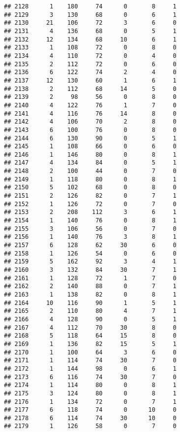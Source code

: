 \documentclass[
]{article}
\begin{document}
\begin{verbatim}
## 2128      1    180     74      0       8     1
## 2129      3    130     68      0       6     1
## 2130     21    106     72      3       6     0
## 2131      4    136     68      0       5     1
## 2132     12    134     68     10       6     1
## 2133      1    108     72      0       8     0
## 2134      4    110     72      0       4     0
## 2135      2    112     72      0       6     0
## 2136      6    122     74      2       4     0
## 2137     12    130     60      1       6     1
## 2138      2    112     68     14       5     0
## 2139      2     98     56      0       8     0
## 2140      4    122     76      1       7     0
## 2141      4    116     76     14       8     0
## 2142      4    106     70      2       8     0
## 2143      6    100     76      0       8     0
## 2144      6    130     90      0       5     1
## 2145      1    108     66      0       6     0
## 2146      1    146     80      0       8     1
## 2147      4    134     84      0       5     1
## 2148      2    100     44      0       7     0
## 2149      1    118     80      0       8     1
## 2150      5    102     68      0       8     0
## 2151      2    126     82      0       7     1
## 2152      1    126     72      0       7     0
## 2153      2    208    112      3       6     1
## 2154      1    140     76      0       8     1
## 2155      3    106     56      0       7     0
## 2156      1    140     76      3       8     1
## 2157      6    128     62     30       6     0
## 2158      1    126     54      0       6     0
## 2159      5    162     92      3       4     1
## 2160      3    132     84     30       7     1
## 2161      1    128     72      1       7     0
## 2162      2    140     88      0       7     1
## 2163      1    138     82      0       8     1
## 2164     10    116     90      1       5     1
## 2165      2    110     80      4       7     1
## 2166      4    128     90      0       5     1
## 2167      4    112     70     30       8     0
## 2168      5    118     64     15       8     0
## 2169      1    136     82     15       5     1
## 2170      1    100     64      3       6     0
## 2171      1    114     74     30       7     0
## 2172      1    144     98      0       6     1
## 2173      6    116     74     30       7     0
## 2174      1    114     80      0       8     1
## 2175      3    124     80      0       8     1
## 2176      1    134     72      0       7     1
## 2177      6    118     74      0      10     0
## 2178      6    114     74     30      10     0
## 2179      1    126     58      0       7     0

\end{verbatim}
\end{document}
